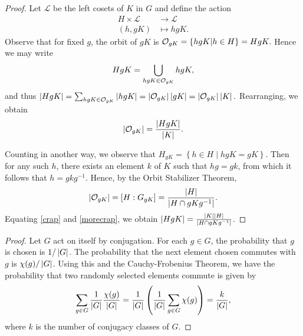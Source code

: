 \documentclass[10pt]{amsart}
\begin{document}
\begin{thm}
  \begin{proof}
    Let $\mathcal{L}$ be the left cosets of $K$ in $G$ and define the action
    \begin{align*}
      H \times \mathcal{L} &\rightarrow \mathcal{L}\\
      (h,gK) &\mapsto hgK.
    \end{align*}
    Observe that for fixed $g$, the orbit of $gK$ is $\mathcal{O}_{gK} = \left\{hgK \middle\vert h \in H\right\} = HgK.$
    Hence we may write $$HgK = \bigcup_{hgK \in \mathcal{O}_{gK}} hgK,$$
    and thus $\left| HgK \right| = \sum_{hgK \in \mathcal{O}_{gK}} \left| hgK \right| = \left| \mathcal{O}_{gK} \right|\left| gK \right| = \left| \mathcal{O}_{gK} \right|\left| K \right|.$
    Rearranging, we obtain 
    \begin{equation}\label{crap}
          \left| \mathcal{O}_{gK} \right| = \frac{\left| HgK \right|}{\left| K \right|}.
    \end{equation}
    
    Counting in another way, we observe that $H_{gK} = \left\{h \in H \middle\vert hgK = gK\right\}$.
    Then for any such $h$, there exists an element $k$ of $K$ such that $hg = gk$, from which it follows that $h = gkg^{-1}$.
    Hence, by the Orbit Stabilizer Theorem, 
    \begin{equation}\label{morecrap}
      \left| \mathcal{O}_{gK} \right| = [H : G_{gK}] = \frac{\left| H \right|}{\left| H \cap gKg^{-1} \right|}.
    \end{equation}
    Equating \eqref{crap} and \eqref{morecrap}, we obtain $\left| HgK \right| = \frac{\left| K \right|\left| H \right|}{\left| H \cap gKg^{-1} \right|}$.
  \end{proof}
\end{thm}

\begin{thm}
  \begin{proof}
    Let $G$ act on itself by conjugation.
    For each $g \in G$, the probability that $g$ is chosen is $1/\left| G \right|$.
    The probability that the next element chosen commutes with $g$ is $\chi(g)/\left| G \right|$.
    Using this and the Cauchy-Frobenius Theorem, we have the probability that two randomly selected elements commute is given by 
    $$\sum_{g \in G} \frac{1}{\left| G \right|} \frac{\chi(g)}{\left| G \right|} = \frac{1}{\left| G \right|} \left(\frac{1}{\left| G \right|} \sum_{g \in G} \chi(g) \right) = \frac{k}{\left| G \right|},$$
    where $k$ is the number of conjugacy classes of $G$.
  \end{proof}
\end{thm}
\end{document}
